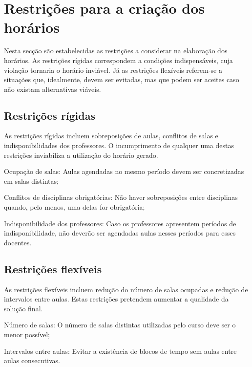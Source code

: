 \section{Restrições para a criação dos horários}
\label{capitulo3:Restricoes}

Nesta secção são estabelecidas as restrições a considerar na elaboração dos horários. As restrições rígidas correspondem a condições indispensáveis, cuja violação tornaria o horário inviável. Já as restrições flexíveis referem-se a situações que, idealmente, devem ser evitadas, mas que podem ser aceites caso não existam alternativas viáveis.

\subsection{Restrições rígidas}

As restrições rígidas incluem sobreposições de aulas, conflitos de salas e indisponibilidades dos professores. O incumprimento de qualquer uma destas restrições inviabiliza a utilização do horário gerado.

\begin{compactenum}
    \item Ocupação de salas: Aulas agendadas no mesmo período devem ser concretizadas em salas distintas;
    \item Conflitos de disciplinas obrigatórias: Não haver sobreposições entre disciplinas quando, pelo menos, uma delas for obrigatória;
    \item Indisponibilidade dos professores: Caso os professores apresentem períodos de indisponibilidade, não deverão ser agendadas aulas nesses períodos para esses docentes.
\end{compactenum}

\subsection{Restrições flexíveis}

As restrições flexíveis incluem redução do número de salas ocupadas e redução de intervalos entre aulas. Estas restrições pretendem aumentar a qualidade da solução final.

\begin{compactenum}
    \item Número de salas: O número de salas distintas utilizadas pelo curso deve ser o menor possível;
    \item Intervalos entre aulas: Evitar a existência de blocos de tempo sem aulas entre aulas consecutivas.
\end{compactenum}

